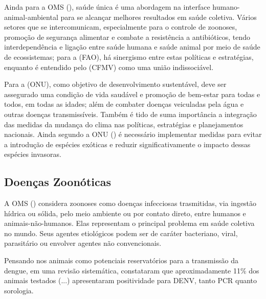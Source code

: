 \indent Ainda para a \acrshort{OMS} (\citeyear{OMS2022S1}), saúde única é uma abordagem na interface humano-animal-ambiental para se alcançar melhores resultados em saúde coletiva. Vários setores que se intercomunicam, especialmente para o controle de zoonoses, promoção de segurança alimentar e combate a resistência a antibióticos, tendo interdependência e ligação entre saúde humana e saúde animal por meio de saúde de ecossistemas; para a  (\acrshort{FAO}), há sinergismo entre estas políticas e estratégias, enquanto é entendido pelo  (\acrshort{CFMV}) como uma união indissociável.

\indent Para a  (\acrshort{ONU}), como objetivo de desenvolvimento sustentável, deve ser assegurado uma condição de vida saudável e promoção de bem-estar para todas e todos, em todas as idades; além de combater doenças veiculadas pela água e outras doenças transmissíveis. Também é tido de suma importância a integração das medidas da mudança do clima nas políticas, estratégias e planejamentos nacionais. Ainda segundo a \acrshort{ONU} (\citeyear{ONUODS22}) é necessário implementar medidas para evitar a introdução de espécies exóticas e reduzir significativamente o impacto dessas espécies invasoras.

\subsection{Doenças Zoonóticas}

\indent A \acrshort{OMS} (\citeyear{WHO2020Zoonoses}) considera zoonoses como doenças infecciosas trasmitidas, via ingestão hídrica ou sólida, pelo meio ambiente ou por contato direto, entre humanos e animais-não-humanos. Elas representam o principal problema em saúde coletiva no mundo. Seus agentes etiológicos podem ser de caráter bacteriano, viral, parasitário ou envolver agentes não convencionais.

\indent Pensando nos animais como potenciais reservatórios para a transmissão da dengue,  em uma revisão sistemática, constataram que aproximadamente 11\% dos animais testados (...) apresentaram positividade para DENV, tanto PCR quanto sorologia.



